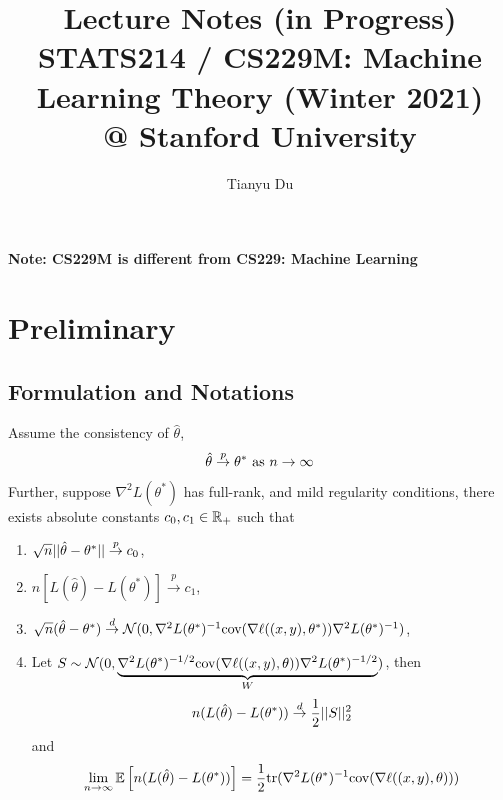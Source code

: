 \documentclass[11pt]{article}
\title{Lecture Notes (in Progress) \\ STATS214 / CS229M: Machine Learning Theory (Winter 2021) \\ @ Stanford University}
\author{Tianyu Du}
\newcommand{\thetahat}[0]{\hat{\theta}}
\newcommand{\convp}[0]{\overset{p}{\rightarrow}}
\newcommand{\convd}[0]{\overset{d}{\rightarrow}}
\newcommand{\inv}[0]{^{-1}}
\newcommand{\cov}[0]{\text{cov}}
\newcommand{\tr}[0]{\text{tr}}
\begin{document}
	\maketitle
	\textbf{Note: CS229M is different from CS229: Machine Learning}
	\section{Preliminary}
	
	\subsection{Formulation and Notations}
	\begin{theorem}
		\label{thm:1}
		Assume the consistency of $\hat{\theta}$, 
		\begin{align}
			\thetahat \convp \theta^* \tx{ as } n \to \infty
		\end{align}
		Further, suppose $\nabla^2L(\theta^*)$ has full-rank, and mild regularity conditions, there exists absolute constants $c_0, c_1 \in \mathbb{R}_+$ such that
		\begin{enumerate}
			\item $\sqrt{n} \norm{\thetahat - \theta^*} \convp c_0$,
			\item $n[L(\thetahat) - L(\theta^*)] \convp c_1$,
			\item $\sqrt{n} (\thetahat - \theta^*) \convd \mc{N}(0, \nabla^2L(\theta^*)\inv \cov(\nabla \ell((x,y),\theta^*)) \nabla^2L(\theta^*)\inv)$,
			\item Let $S \sim \mc{N}(0, \underbrace{\nabla^2 L(\theta^*)^{-1/2} \cov(\nabla \ell((x,y),\theta)) \nabla^2 L(\theta^*)^{-1/2}}_{W})$,
			then $$n(L(\thetahat) - L(\theta^*)) \convd \frac{1}{2} \norm{S}_2^2$$
			and $$\lim_{n \to \infty} \expect{n(L(\thetahat) - L(\theta^*))} = \frac{1}{2} \tr(\nabla^2 L(\theta^*)^{-1} \cov(\nabla \ell((x,y),\theta))) $$
		\end{enumerate}
	\end{theorem}
\end{document}
